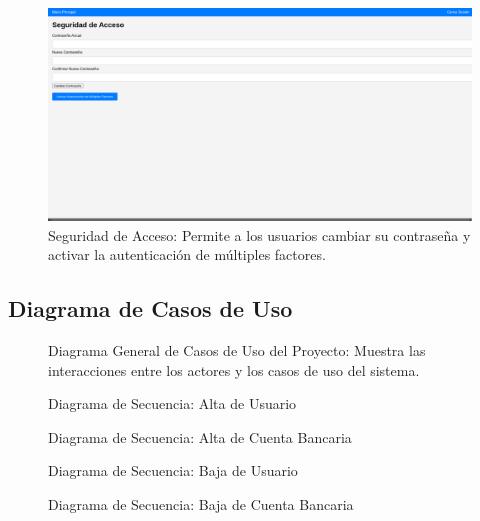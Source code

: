 \documentclass{article}
\begin{document}
\begin{figure}[H]
    \centering
    \includegraphics[width=\textwidth]{img/image9.png}
    \caption{Seguridad de Acceso: Permite a los usuarios cambiar su contraseña y activar la autenticación de múltiples factores.}
\end{figure}

\subsection{Diagrama de Casos de Uso}

\begin{figure}[H]
    \centering
    \caption{Diagrama General de Casos de Uso del Proyecto: Muestra las interacciones entre los actores y los casos de uso del sistema.}
\end{figure}

\begin{figure}[H]
    \centering
    \caption{Diagrama de Secuencia: Alta de Usuario}
\end{figure}

\begin{figure}[H]
    \centering
    \caption{Diagrama de Secuencia: Alta de Cuenta Bancaria}
\end{figure}

\begin{figure}[H]
    \centering
    \caption{Diagrama de Secuencia: Baja de Usuario}
\end{figure}

\begin{figure}[H]
    \centering
    \caption{Diagrama de Secuencia: Baja de Cuenta Bancaria}
\end{figure}
\end{document}
